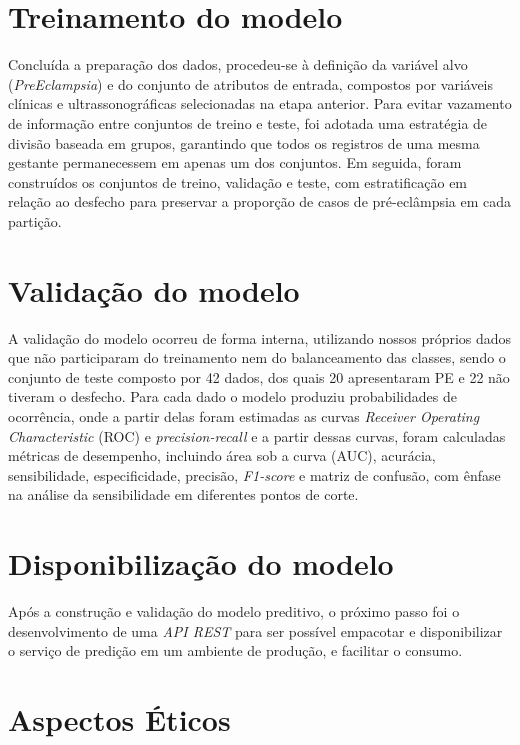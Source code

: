 \documentclass[12pt, a4paper]{report}
\theoremstyle{definition}
\theoremstyle{remark}
\theoremstyle{plain}
\begin{document}
\section{Treinamento do modelo}

Concluída a preparação dos dados, procedeu-se à definição da variável alvo (\textit{PreEclampsia}) e do conjunto de atributos de entrada, compostos por variáveis clínicas e ultrassonográficas selecionadas na etapa anterior. Para evitar vazamento de informação entre conjuntos de treino e teste, foi adotada uma estratégia de divisão baseada em grupos, garantindo que todos os registros de uma mesma gestante permanecessem em apenas um dos conjuntos. Em seguida, foram construídos os conjuntos de treino, validação e teste, com estratificação em relação ao desfecho para preservar a proporção de casos de pré-eclâmpsia em cada partição.


\section{Validação do modelo}

A validação do modelo ocorreu de forma interna, utilizando nossos próprios dados que não participaram do treinamento nem do balanceamento das classes, sendo o conjunto de teste composto por 42 dados, dos quais 20 apresentaram PE e 22 não tiveram o desfecho. Para cada dado o modelo produziu probabilidades de ocorrência, onde a partir delas foram estimadas as curvas \textit{Receiver Operating Characteristic} (ROC) e \textit{precision-recall} e a partir dessas curvas, foram calculadas métricas de desempenho, incluindo área sob a curva (AUC), acurácia, sensibilidade, especificidade, precisão, \textit{F1-score} e matriz de confusão, com ênfase na análise da sensibilidade em diferentes pontos de corte.

\section{Disponibilização do modelo}

Após a construção e validação do modelo preditivo, o próximo passo foi o desenvolvimento de uma \textit{API REST} para ser possível empacotar e disponibilizar o serviço de predição em um ambiente de produção, e facilitar o consumo.


\section{Aspectos Éticos}
\end{document}
